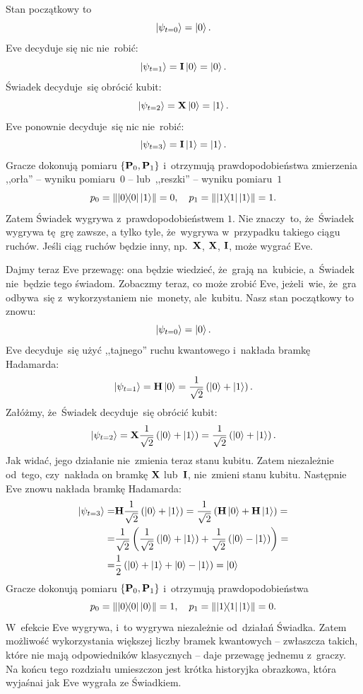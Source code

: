 Stan początkowy to
$$
	\ket{\psi_{t=0}}=\ket{0}.
$$
Eve decyduje się nic nie~robić:
$$
	\ket{\psi_{t=1}}=\mathbf{I}\ket{0}=\ket{0}.
$$
Świadek decyduje~się obrócić kubit:
$$
	\ket{\psi_{t=2}}=\mathbf{X}\ket{0}=\ket{1}.
$$
Eve ponownie decyduje~się nic nie~robić:
$$
	\ket{\psi_{t=3}}=\mathbf{I}\ket{1}=\ket{1}.
$$
Gracze dokonują pomiaru $\{\mathbf{P}_0,\mathbf{P}_1\}$ i~otrzymują
prawdopodobieństwa zmierzenia ,,orła'' -- wyniku pomiaru~$0$ -- lub~,,reszki'' -- wyniku pomiaru~$1$
$$
	p_0=\norm{\ketbra{0}{0}\ket{1}}=0, \quad p_1=\norm{\ketbra{1}{1}\ket{1}}=1.
$$
Zatem Świadek wygrywa z~prawdopodobieństwem $1$. Nie znaczy~to, że~Świadek wygrywa
tę~grę zawsze, a tylko tyle, że~wygrywa w~przypadku takiego ciągu ruchów.
Jeśli ciąg ruchów będzie inny, np.~$\mathbf{X}$, $\mathbf{X}$, $\mathbf{I}$, może wygrać Eve.

Dajmy teraz Eve przewagę: ona będzie wiedzieć, że~grają na~kubicie, a~Świadek nie~będzie tego świadom.
Zobaczmy teraz, co może zrobić Eve, jeżeli~wie, że~gra odbywa~się z~wykorzystaniem nie~monety, ale~kubitu.
Nasz stan początkowy to znowu:
$$
	\ket{\psi_{t=0}}=\ket{0}.
$$
Eve decyduje~się użyć ,,tajnego'' ruchu kwantowego i~nakłada bramkę Hadamarda:
$$
	\ket{\psi_{t=1}}=\mathbf{H}\ket{0}=\frac{1}{\sqrt{2}}\left(\ket{0}+\ket{1}\right).
$$
Załóżmy, że~Świadek decyduje~się obrócić kubit:
$$
	\ket{\psi_{t=2}}=\mathbf{X}\frac{1}{\sqrt{2}}\left(\ket{0}+\ket{1}\right)=\frac{1}{\sqrt{2}}\left(\ket{0}+\ket{1}\right).
$$
Jak widać, jego działanie nie~zmienia teraz stanu kubitu. Zatem niezależnie od~tego, czy~nakłada on bramkę $\mathbf{X}$ lub~$\mathbf{I}$, nie~zmieni stanu kubitu.
Następnie Eve znowu nakłada bramkę Hadamarda:
\begin{equation*}
	\begin{split}
		\ket{\psi_{t=3}}=&\mathbf{H}\frac{1}{\sqrt{2}}\left(\ket{0}+\ket{1}\right)=
		\frac{1}{\sqrt{2}}\left(\mathbf{H}\ket{0}+\mathbf{H}\ket{1}\right)=\\
		=&\frac{1}{\sqrt{2}}\left(\frac{1}{\sqrt{2}}\left(\ket{0}+\ket{1}\right)+
		\frac{1}{\sqrt{2}}\left(\ket{0}-\ket{1}\right)\right)=\\
		=&\frac{1}{2}\left(\ket{0}+\ket{1}+\ket{0}-\ket{1}\right)=
		\ket{0}
	\end{split}
\end{equation*}
Gracze dokonują pomiaru $\{\mathbf{P}_0,\mathbf{P}_1\}$ i~otrzymują prawdopodobieństwa
$$
	p_0=\norm{\ketbra{0}{0}\ket{0}}=1, \quad p_1=\norm{\ketbra{1}{1}\ket{1}}=0.
$$
W~efekcie Eve wygrywa, i~to wygrywa niezależnie od~działań Świadka.
Zatem możliwość wykorzystania większej liczby bramek kwantowych -- zwłaszcza takich,
które nie mają odpowiedników klasycznych -- daje przewagę jednemu z~graczy.
Na końcu tego rozdziału umieszczon jest krótka
historyjka obrazkowa, która wyjaśnai jak Eve wygrała ze Świadkiem.

